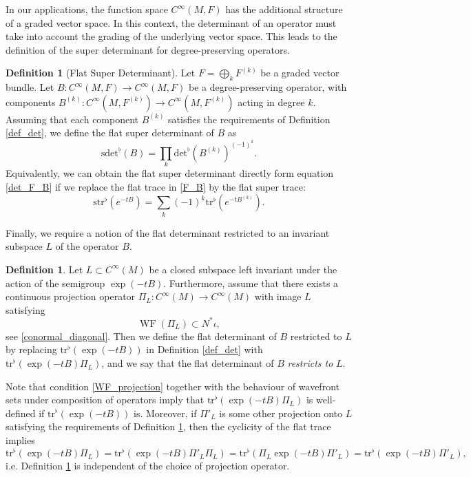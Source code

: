 \documentclass[reqno]{amsart}
\theoremstyle{definition}
\newtheorem{defn}[thm]{Definition}
\theoremstyle{remark}
\newcommand{\C}{C^\infty}
\newcommand{\tr}{\mathrm{tr}^\flat}
\renewcommand{\det}{\mathrm{det}^\flat}
\newcommand{\sdet}{\mathrm{sdet}^\flat}
\newcommand{\str}{\mathrm{str}^\flat}
\DeclareMathOperator{\WF}{WF}
\begin{document}
In our applications, the function space $\C(M,F)$ has the additional structure of a graded vector space. In this context, the determinant of an operator must take into account the grading of the underlying vector space. This leads to the definition of the super determinant for degree-preserving operators. 

\begin{defn}[Flat Super Determinant]
Let $F=\bigoplus_k F^{(k)}$ be a graded vector bundle. Let $B: \C(M,F)\to\C(M,F)$ be a degree-preserving operator, with components $B^{(k)}: \C(M,F^{(k)})\to\C(M,F^{(k)})$ acting in degree $k$. Assuming that each component $B^{(k)}$ satisfies the requirements of Definition \ref{def_det}, we define the flat super determinant of $B$ as
\begin{equation}
    \sdet(B) = \prod_k \det(B^{(k)})^{(-1)^k}.
\end{equation}
Equivalently, we can obtain the flat super determinant directly form equation \eqref{det_F_B} if we replace the flat trace in \eqref{F_B} by the flat super trace:
\begin{equation}
    \str(e^{-tB}) = \sum_k (-1)^k \tr(e^{-tB^{(k)}}).
\end{equation}
\end{defn}

Finally, we require a notion of the flat determinant restricted to an invariant subspace $L$ of the operator $B$.
\begin{defn}
\label{det_restricted}
    Let $L\subset\C(M)$ be a closed subspace left invariant under the action of the semigroup $\exp(-tB)$. Furthermore, assume that there exists a continuous projection operator $\Pi_L: \C(M)\to\C(M)$ with image $L$ satisfying
    \begin{equation}
    \label{WF_projection}
        \WF(\Pi_L) \subset N^*\iota,
    \end{equation}
    see \eqref{conormal_diagonal}. Then we define the flat determinant of $B$ restricted to $L$ by replacing $\tr(\exp(-tB))$ in Definition \ref{def_det} with $\tr(\exp(-tB)\Pi_L)${, and we say that the flat determinant of $B$ \emph{restricts to} $L$.}
\end{defn}
\begin{rmk}
Note that condition \eqref{WF_projection} together with the behaviour of wavefront sets under composition of operators \cite[Theorem 8.2.14]{hormander1} imply that $\tr(\exp(-tB)\Pi_L)$ is well-defined if $\tr(\exp(-tB))$ is. Moreover, if $\Pi'_L$ is some other projection onto $L$ satisfying the requirements of Definition \ref{det_restricted}, then the cyclicity of the flat trace implies
\begin{equation*}
    \tr(\exp(-tB)\Pi_L) = \tr(\exp(-tB)\Pi'_L\Pi_L) = \tr(\Pi_L\exp(-tB)\Pi'_L) = \tr(\exp(-tB)\Pi'_L),
\end{equation*}
i.e. Definition \ref{det_restricted} is independent of the choice of projection operator.
\end{rmk}










\printbibliography
\end{document}
